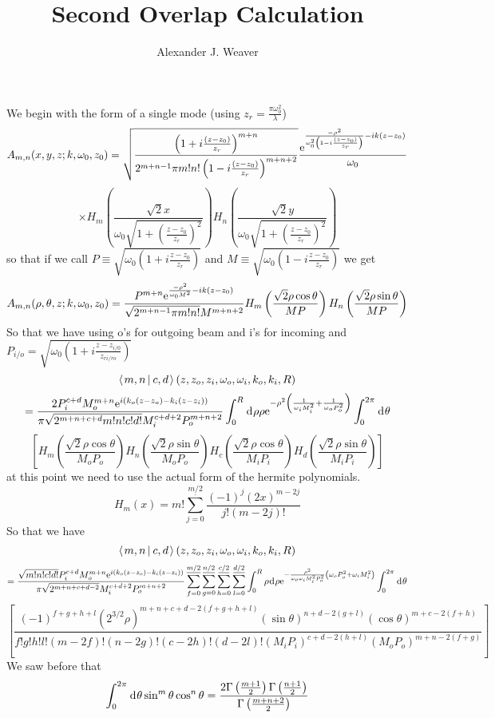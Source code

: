 \documentclass[11pt]{amsart}
\title{Second Overlap Calculation}
\author{Alexander J. Weaver}
\date{}                 		  %
\makeatletter
\newcommand{\e}{{\rm e}}				%
\newcommand{\msp}[1]{\mspace{#1mu}}		%
\newcommand{\0}{\varnothing}		%
\newcommand{\eq}{\equiv}		%
\newcommand{\dd}{\msp{1} {\rm{d}} \msp{1}}	%
\newcommand{\brac}[2]{\left\langle\msp{2} #1\left\lvert \msp{3.5} #2 \right.\right\rangle}	%
\newcommand{\1}{!}
\newcommand{\2}{@}
\newcommand{\3}{\#}
\newcommand{\4}{\$}
\newcommand{\5}{\%}
\newcommand{\6}{$^\wedge$}
\newcommand{\7}{\&}
\newcommand{\8}{*}
\newcommand{\9}{(}
\makeatother
\begin{document}
\maketitle
We begin with the form of a single mode (using $z_r = \frac{\pi \omega_0^2}{\lambda}$)
\[
A_{m,n}(x,y,z;k,\omega_0,z_0) = \sqrt{\frac{\left(1+i\frac{(z-z_0)}{z_r}\right)^{m+n}}{2^{m+n-1}\pi m!n!\left(1-i\frac{(z-z_0)}{z_r}\right)^{m+n+2}}}\frac{\e^{\frac{-\rho^2}{\omega_0^2\left(1-i\frac{(z-z_0)}{z_r}\right)}-ik(z-z_0)}}{\omega_0}\]\[\times H_m\left(\frac{\sqrt{2}x}{\omega_0\sqrt{1+\left(\frac{z-z_0}{z_r}\right)^2}}\right)H_n\left(\frac{\sqrt{2}y}{\omega_0\sqrt{1+\left(\frac{z-z_0}{z_r}\right)^2}}\right)
\]
so that if we call $P\eq \sqrt{\omega_0\left(1+i\frac{z-z_0}{z_r}\right)}$ and $M\eq \sqrt{\omega_0\left(1-i\frac{z-z_0}{z_r}\right)}$ we get
\[
A_{m,n}(\rho,\theta,z;k,\omega_0,z_0) = \frac{P^{m+n}\e^{\frac{-\rho^2}{\omega_0M^2}-ik(z-z_0)}}{\sqrt{2^{m+n-1}\pi m! n!}M^{m+n+2}}H_m\left(\frac{\sqrt{2}\rho\cos\theta}{MP}\right)H_n\left(\frac{\sqrt{2}\rho\sin\theta}{MP}\right)
\] So that we have using o's for outgoing beam and i's for incoming and $P_{i/o} = \sqrt{\omega_0\left(1+i\frac{z-z_{i/0}}{z_{ri/ro}}\right)}$
\[
\brac{m,n}{c,d}(z,z_o,z_i,\omega_o,\omega_i,k_o,k_i,R)
\]
\[
=\frac{2P_i^{c+d}M_o^{m+n}\e^{i\left(k_o(z-z_o)-k_i(z-z_i)\right)}}{\pi\sqrt{2^{m+n+c+d} m!n!c!d!}M_i^{c+d+2}P_o^{m+n+2}}\int_0^R\dd \rho \rho \e^{-\rho^2\left(\frac{1}{\omega_iM_i^2}+\frac{1}{\omega_oP_o^2}\right)}\int_0^{2\pi}\dd \theta
\]
\[
\left[H_m\left(\frac{\sqrt{2}\rho \cos\theta}{M_oP_o}\right)H_n\left(\frac{\sqrt{2}\rho \sin\theta}{M_oP_o}\right)H_c\left(\frac{\sqrt{2}\rho \cos\theta}{M_iP_i}\right)H_d\left(\frac{\sqrt{2}\rho \sin\theta}{M_iP_i}\right)\right]
\]
at this point we need to use the actual form of the hermite polynomials.
\[
H_m(x) = m!\sum_{j=0}^{\underline{m/2}}\frac{(-1)^j(2x)^{m-2j}}{j!(m-2j)!}
\]
So that we have
\[
\brac{m,n}{c,d}(z,z_o,z_i,\omega_o,\omega_i,k_o,k_i,R)
\]
\[
=\frac{\sqrt{m!n!c!d!}P_i^{c+d}M_o^{m+n}\e^{i\left(k_o(z-z_o)-k_i(z-z_i)\right)}}{\pi\sqrt{2^{m+n+c+d-2}}M_i^{c+d+2}P_o^{m+n+2}}\sum_{f=0}^{\underline{m/2}}\sum_{g=0}^{\underline{n/2}}\sum_{h=0}^{\underline{c/2}}\sum_{l=0}^{\underline{d/2}}\int_0^R \rho \dd \rho \e^{-\frac{\rho^2}{\omega_o\omega_iM_i^2P_o^2}\left(\omega_oP_o^2+\omega_iM_i^2\right)}\int_0^{2\pi}\dd \theta
\]
\[
\left[\frac{(-1)^{f+g+h+l}(2^{3/2}\rho)^{m+n+c+d-2(f+g+h+l)}(\sin\theta)^{n+d-2(g+l)}(\cos\theta)^{m+c-2(f+h)}}{f!g!h!l!(m-2f)!(n-2g)!(c-2h)!(d-2l)!(M_iP_i)^{c+d-2(h+l)}(M_oP_o)^{m+n-2(f+g)}}\right]
\]
We saw before that
\[
\int_0^{2\pi} \dd \theta \sin^m\theta \cos^n\theta = \frac{2\Gamma\left(\frac{m+1}{2}\right)\Gamma\left(\frac{n+1}{2}\right)}{\Gamma\left(\frac{m+n+2}{2}\right)}
\]
\end{document}
